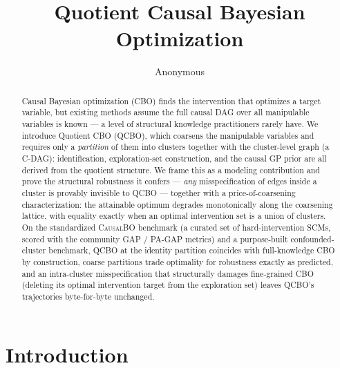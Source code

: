 \documentclass{article}
\title{Quotient Causal Bayesian Optimization}
\author{Anonymous}
\newcommand{\QCBO}{\textsc{QCBO}}
\begin{document}
\maketitle

\begin{abstract}
Causal Bayesian optimization (CBO) finds the intervention that optimizes a
target variable, but existing methods assume the full causal DAG over all
manipulable variables is known --- a level of structural knowledge
practitioners rarely have. We introduce Quotient CBO (\QCBO{}), which
coarsens the manipulable variables and requires only a \emph{partition} of
them into clusters together with the cluster-level graph (a C-DAG):
identification, exploration-set construction, and the causal GP prior are all
derived from the quotient structure. We frame this as a modeling contribution
and prove the structural robustness it confers --- \emph{any} misspecification
of edges inside a cluster is provably invisible to \QCBO{} --- together with a
price-of-coarsening characterization: the attainable optimum degrades
monotonically along the coarsening lattice, with equality exactly when an
optimal intervention set is a union of clusters. On the standardized
\textsc{CausalBO} benchmark (a curated set of hard-intervention SCMs, scored
with the community GAP / PA-GAP metrics) and a purpose-built
confounded-cluster benchmark, \QCBO{} at the identity partition coincides with
full-knowledge CBO by construction, coarse partitions trade optimality for
robustness exactly as predicted, and an intra-cluster misspecification that
structurally damages fine-grained CBO (deleting its optimal intervention
target from the exploration set) leaves \QCBO{}'s trajectories byte-for-byte
unchanged.
\end{abstract}

\section{Introduction}
\label{sec:intro}
\end{document}
